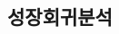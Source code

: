 \documentclass[handout, 10pt]{beamer}
\begin{document}
\subsection{성장회귀분석}
\begin{frame}
    \begin{table}[htbp]
        \begin{adjustbox}{width=\textwidth, totalheight=\baselineskip,keepaspectratio}
            \begin{threeparttable}
                
            \end{threeparttable}
        \end{adjustbox}
    \end{table}
\end{frame}

\begin{frame}
    \begin{table}[htbp]
        \begin{adjustbox}{width=\textwidth, totalheight=\baselineskip,keepaspectratio}
            \begin{threeparttable}
                
            \end{threeparttable}
        \end{adjustbox}
    \end{table}
\end{frame}


\begin{frame}
    \begin{table}[htbp]
        \begin{adjustbox}{width=\textwidth, totalheight=\baselineskip,keepaspectratio}
            \begin{threeparttable}
                
            \end{threeparttable}
        \end{adjustbox}
    \end{table}
\end{frame}

\begin{frame}
    \begin{table}[htbp]
        \begin{adjustbox}{width=\textwidth, totalheight=\baselineskip,keepaspectratio}
            \begin{threeparttable}
                
            \end{threeparttable}
        \end{adjustbox}
    \end{table}
\end{frame}
\end{document}
